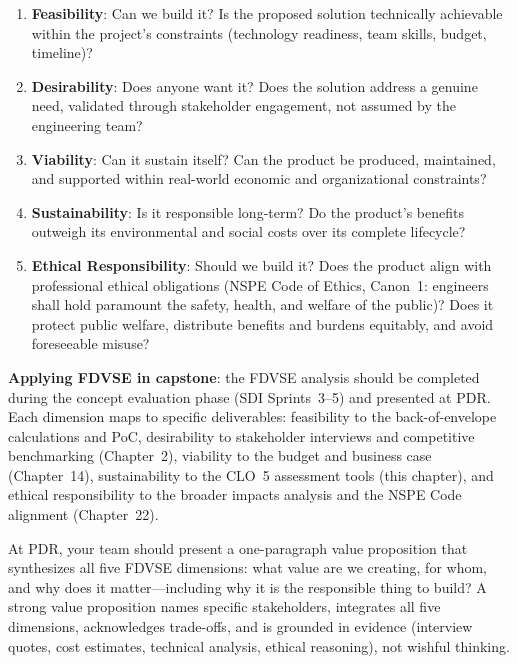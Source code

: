\begin{enumerate}[nosep,leftmargin=1.5em]
\item \textbf{Feasibility}: Can we build it? Is the proposed solution technically achievable within the project's constraints (technology readiness, team skills, budget, timeline)?
\item \textbf{Desirability}: Does anyone want it? Does the solution address a genuine need, validated through stakeholder engagement, not assumed by the engineering team?
\item \textbf{Viability}: Can it sustain itself? Can the product be produced, maintained, and supported within real-world economic and organizational constraints?
\item \textbf{Sustainability}: Is it responsible long-term? Do the product's benefits outweigh its environmental and social costs over its complete lifecycle?
\item \textbf{Ethical Responsibility}: Should we build it? Does the product align with professional ethical obligations (NSPE Code of Ethics, Canon~1: engineers shall hold paramount the safety, health, and welfare of the public)? Does it protect public welfare, distribute benefits and burdens equitably, and avoid foreseeable misuse?
\end{enumerate}

\textbf{Applying FDVSE in capstone}: the FDVSE analysis should be completed during the concept evaluation phase (SDI Sprints~3--5) and presented at PDR. Each dimension maps to specific deliverables: feasibility to the back-of-envelope calculations and PoC, desirability to stakeholder interviews and competitive benchmarking (Chapter~2), viability to the budget and business case (Chapter~14), sustainability to the CLO~5 assessment tools (this chapter), and ethical responsibility to the broader impacts analysis and the NSPE Code alignment (Chapter~22).

\begin{keyconceptbox}
At PDR, your team should present a one-paragraph value proposition that synthesizes all five FDVSE dimensions: what value are we creating, for whom, and why does it matter---including why it is the responsible thing to build? A strong value proposition names specific stakeholders, integrates all five dimensions, acknowledges trade-offs, and is grounded in evidence (interview quotes, cost estimates, technical analysis, ethical reasoning), not wishful thinking.
\end{keyconceptbox}

